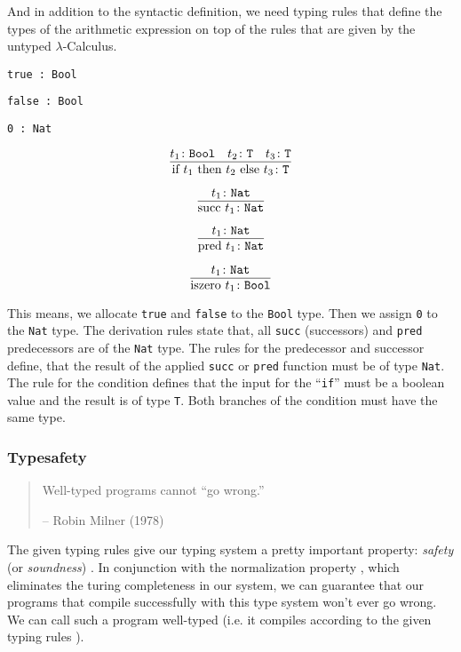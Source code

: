 And in addition to the syntactic definition, we need typing rules
that define the types of the arithmetic expression on top of
the rules that are given by the untyped $\lambda$-Calculus.

\begin{center}
    \texttt{true : Bool}
    
    \texttt{false : Bool}
    
    \texttt{0 : Nat}
\end{center}

\[\infer{ \text{if } t_1 \text{ then } t_2 \text{ else } t_3 \colon \texttt{T} }{ t_1 \colon \texttt{Bool} & t_2 \colon \texttt{T} & t_3 \colon \texttt{T} }\]

\[\infer{ \text{succ } t_1 \colon \texttt{Nat} }{ t_1 \colon \texttt{Nat} }\]

\[\infer{ \text{pred } t_1 \colon \texttt{Nat} }{ t_1 \colon \texttt{Nat} }\]

\[\infer{ \text{iszero } t_1 \colon \texttt{Bool} }{ t_1 \colon \texttt{Nat} }\]

This means, we allocate \texttt{true} and \texttt{false} to the \texttt{Bool} type.
Then we assign \texttt{0} to the \texttt{Nat} type. 
The derivation rules state that, all \texttt{succ} (successors) and \texttt{pred} predecessors are of the
\texttt{Nat} type. The rules for the predecessor and successor define, that the result
of the applied \texttt{succ} or \texttt{pred} function must be of type \texttt{Nat}. The rule for the condition
defines that the input for the ``\texttt{if}'' must be a boolean value and the result is
of type \texttt{T}. Both branches of the condition must have the same type.

\subsubsection{Typesafety}

\begin{quotation}
    Well-typed programs cannot ``go wrong.''
    \begin{flushright}
        -- Robin Milner (1978)
    \end{flushright}
\end{quotation}

The given typing rules give our typing system a pretty important property:
\textit{safety} (or \textit{soundness}) \cite{pierce2002ProgLang}.
In conjunction with the normalization property \cite{pierce2002ProgLang} \cite{baader_nipkow_1998},
which eliminates the turing completeness in our system, we can guarantee that our programs
that compile successfully with this type system won't ever go wrong. We can call
such a program well-typed (i.e. it compiles according to the given typing rules \cite{cardelliTypeSystems}).


